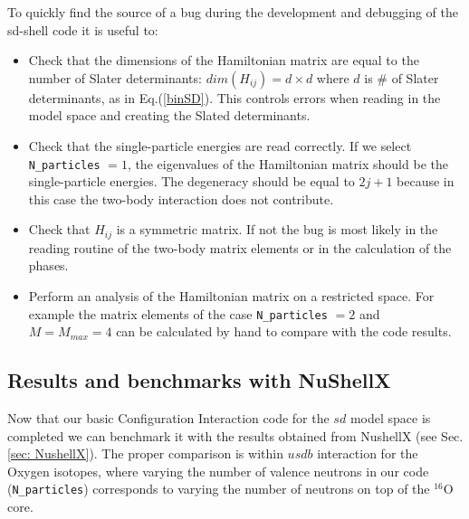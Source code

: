 \documentclass[twoside]{article}
\begin{document}
To quickly find the source of a bug during the development and debugging of the sd-shell code it is useful to:
\begin{itemize}
\item Check that the dimensions of the Hamiltonian matrix are equal to the number of Slater determinants: $dim(H_{ij})=d \times d$ where $d$ is $\#$ of Slater determinants, as in Eq.(\ref{binSD}). This controls errors when reading in the model space and creating the Slated determinants.
\item Check that the single-particle energies are read correctly. If we select \texttt{N\_particles} $=1$, the eigenvalues of the Hamiltonian matrix should be the single-particle energies. The degeneracy should be equal to $2j+1$ because in this case the two-body interaction does not contribute.
\item Check that $H_{ij}$ is a symmetric matrix. If not the bug is most likely in the reading routine of the two-body matrix elements or in the calculation of the phases.
\item Perform an analysis of the Hamiltonian matrix on a restricted space. For example the matrix elements of the case \texttt{N\_particles} $=2$ and $M=M_{max}=4$ can be calculated by hand to compare with the code results.
\end{itemize}





\subsection{Results and benchmarks with NuShellX}
\label{subsec: results}

Now that our basic Configuration Interaction code for the $sd$ model space is completed we can benchmark it with the results obtained from NushellX (see Sec.\ref{sec: NushellX}).
The proper comparison is within $usdb$ interaction for the Oxygen isotopes, where varying the number of valence neutrons in our code (\texttt{N\_particles}) corresponds to varying the number of neutrons on top of the $^{16}$O core. 
\end{document}
